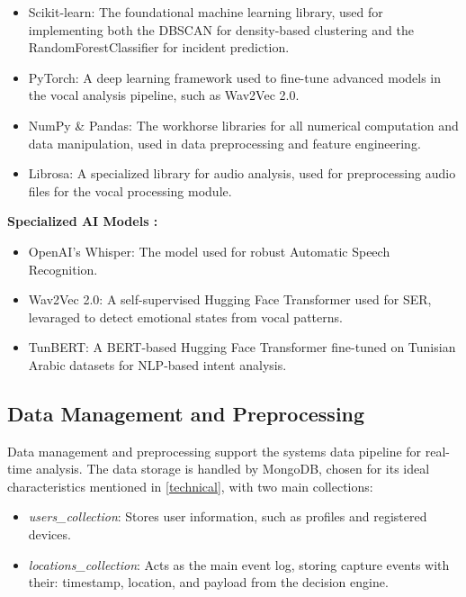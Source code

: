 \documentclass[12pt,a4paper,oneside,english]{book}
\begin{document}
{\begin{itemize}

\item Scikit-learn: The foundational machine learning library, used for implementing both the DBSCAN for density-based clustering and the RandomForestClassifier for incident prediction.
\item PyTorch: A deep learning framework used to fine-tune advanced models in the vocal analysis pipeline, such as Wav2Vec 2.0.
\item NumPy \& Pandas: The workhorse libraries for all numerical computation and data manipulation, used in data preprocessing and feature engineering.
\item Librosa: A specialized library for audio analysis, used for preprocessing audio files for the vocal processing module.
\end{itemize}

\textbf{Specialized AI Models :}
\begin{itemize}
\item OpenAI's Whisper: The model used for robust Automatic Speech Recognition.
\item Wav2Vec 2.0: A self-supervised Hugging Face Transformer used for SER, levaraged to detect emotional states from vocal patterns.
\item TunBERT: A BERT-based Hugging Face Transformer fine-tuned on Tunisian Arabic datasets for NLP-based intent analysis.%
\end{itemize}

\subsection{Data Management and Preprocessing}
\label{sec:data_management}
Data management and preprocessing support the systems data pipeline for real-time analysis.
The data storage is handled by MongoDB, chosen for its ideal characteristics mentioned in \ref{technical}, with two main collections:
\begin{itemize}
    \item \textit{users\_collection}: Stores user information, such as profiles and registered devices.
    \item \textit{locations\_collection}: Acts as the main event log, storing capture events with their: timestamp, location, and payload from the decision engine.
\end{itemize}

}
\end{document}
